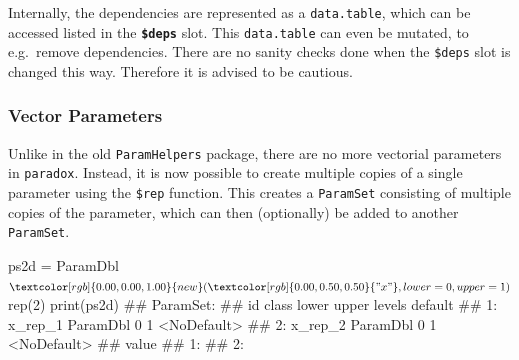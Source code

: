 \documentclass[12pt,]{scrbook}
\newenvironment{Shaded}{}{}
\newcommand{\DataTypeTok}[1]{#1}
\newcommand{\DecValTok}[1]{#1}
\newcommand{\KeywordTok}[1]{\textcolor[rgb]{0.00,0.00,1.00}{#1}}
\newcommand{\NormalTok}[1]{#1}
\newcommand{\OperatorTok}[1]{#1}
\newcommand{\StringTok}[1]{\textcolor[rgb]{0.00,0.50,0.50}{#1}}
\begin{document}
Internally, the dependencies are represented as a \texttt{data.table}, which can be accessed listed in the \textbf{\texttt{\$deps}} slot.
This \texttt{data.table} can even be mutated, to e.g.~remove dependencies.
There are no sanity checks done when the \texttt{\$deps} slot is changed this way.
Therefore it is advised to be cautious.

\begin{Shaded}
\end{Shaded}

\hypertarget{vector-parameters}{%
\subsubsection{Vector Parameters}\label{vector-parameters}}

Unlike in the old \texttt{ParamHelpers} package, there are no more vectorial parameters in \texttt{paradox}.
Instead, it is now possible to create multiple copies of a single parameter using the \texttt{\$rep} function.
This creates a \texttt{ParamSet} consisting of multiple copies of the parameter, which can then (optionally) be added to another \texttt{ParamSet}.

\begin{Shaded}
\begin{Highlighting}[]
\NormalTok{ps2d =}\StringTok{ }\NormalTok{ParamDbl}\OperatorTok{$}\KeywordTok{new}\NormalTok{(}\StringTok{"x"}\NormalTok{, }\DataTypeTok{lower =} \DecValTok{0}\NormalTok{, }\DataTypeTok{upper =} \DecValTok{1}\NormalTok{)}\OperatorTok{$}\KeywordTok{rep}\NormalTok{(}\DecValTok{2}\NormalTok{)}
\KeywordTok{print}\NormalTok{(ps2d)}
\NormalTok{## ParamSet: }
\NormalTok{##         id    class lower upper levels     default}
\NormalTok{## 1: x_rep_1 ParamDbl     0     1        <NoDefault>}
\NormalTok{## 2: x_rep_2 ParamDbl     0     1        <NoDefault>}
\NormalTok{##    value}
\NormalTok{## 1:      }
\NormalTok{## 2:}
\end{Highlighting}
\end{Shaded}
\end{document}
